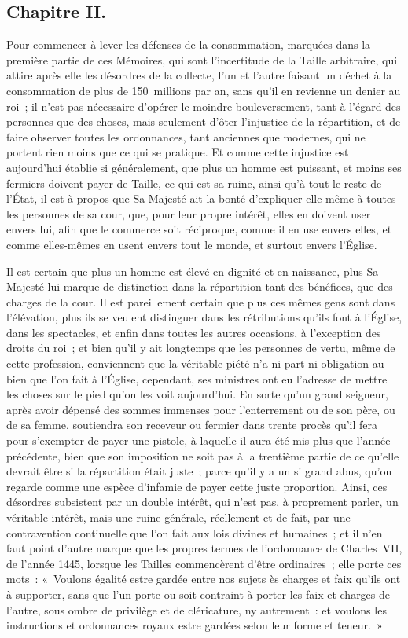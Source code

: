 \documentclass[french,twoside]{book} %
\begin{document}
\subsection[{Chapitre II.}]{Chapitre II.}
\noindent Pour commencer à lever les défenses de la consommation, marquées dans la première partie de ces Mémoires, qui sont l’incertitude de la Taille arbitraire, qui attire après elle les désordres de la collecte, l’un et l’autre faisant un déchet à la consommation de plus de 150 millions par an, sans qu’il en revienne un denier au roi ; il n’est pas nécessaire d’opérer le moindre bouleversement, tant à l’égard des personnes que des choses, mais seulement d’ôter l’injustice de la répartition, et de faire observer toutes les ordonnances, tant anciennes que modernes, qui ne portent rien moins que ce qui se pratique. Et comme cette injustice est aujourd’hui établie si généralement, que plus un homme est puissant, et moins ses fermiers doivent payer de Taille, ce qui est sa ruine, ainsi qu’à tout le reste de l’État, il est à propos que Sa Majesté ait la bonté d’expliquer elle-même à toutes les personnes de sa cour, que, pour leur propre intérêt, elles en doivent user envers lui, afin que le commerce soit réciproque, comme il en use envers elles, et comme elles-mêmes en usent envers tout le monde, et surtout envers l’Église.\par
Il est certain que plus un homme est élevé en dignité et en naissance, plus Sa Majesté lui marque de distinction dans la répartition tant des bénéfices, que des charges de la cour. Il est pareillement certain que plus ces mêmes gens sont dans l’élévation, plus ils se veulent distinguer dans les rétributions qu’ils font à l’Église, dans les spectacles, et enfin dans toutes les autres occasions, à l’exception des droits du roi ; et bien qu’il y ait longtemps que les personnes de vertu, même de cette profession, conviennent que la véritable piété n’a ni part ni obligation au bien que l’on fait à l’Église, cependant, ses ministres ont eu l’adresse de mettre les choses sur le pied qu’on les voit aujourd’hui. En sorte qu’un grand seigneur, après avoir dépensé des sommes immenses pour l’enterrement ou de son père, ou de sa femme, soutiendra son receveur ou fermier dans trente procès qu’il fera pour s’exempter de payer une pistole, à laquelle il aura été mis plus que l’année précédente, bien que son imposition ne soit pas à la trentième partie de ce qu’elle devrait être si la répartition était juste ; parce qu’il y a un si grand abus, qu’on regarde comme une espèce d’infamie de payer cette juste proportion. Ainsi, ces désordres subsistent par un double intérêt, qui n’est pas, à proprement parler, un véritable intérêt, mais une ruine générale, réellement et de fait, par une contravention continuelle que l’on fait aux lois divines et humaines ; et il n’en faut point d’autre marque que les propres termes de l’ordonnance de Charles VII, de l’année 1445, lorsque les Tailles commencèrent d’être ordinaires ; elle porte ces mots : « Voulons égalité estre gardée entre nos sujets ès charges et faix qu’ils ont à supporter, sans que l’un porte ou soit contraint à porter les faix et charges de l’autre, sous ombre de privilège et de cléricature, ny autrement : et voulons les instructions et ordonnances royaux estre gardées selon leur forme et teneur. »\par
\end{document}
